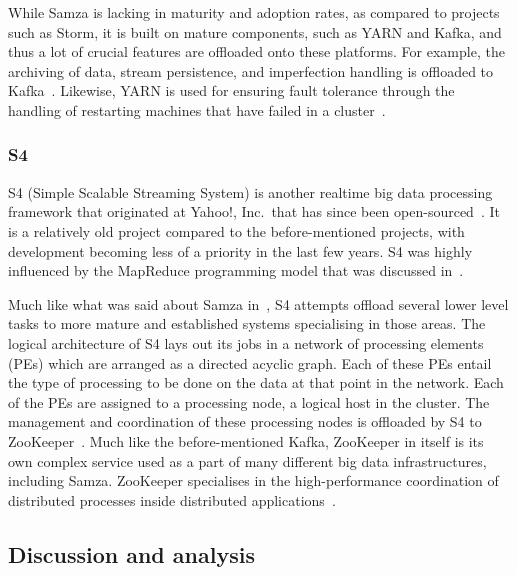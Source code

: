 While Samza is lacking in maturity and adoption rates, as compared to projects such as Storm, it is built on mature
components, such as YARN and Kafka, and thus a lot of crucial features are offloaded onto these platforms. For example,
the archiving of data, stream persistence, and imperfection handling is offloaded to Kafka~\cite{bockermann2014survey}.
Likewise, YARN is used for ensuring fault tolerance through the handling of restarting machines that have failed in a
cluster~\cite{bockermann2014survey}.


\subsubsection{S4} %
\label{ssub:s4}

S4 (Simple Scalable Streaming System) is another realtime big data processing framework that originated at Yahoo!, Inc.\
that has since been open-sourced~\cite{neumeyer2010s4}. It is a relatively old project compared to the before-mentioned projects,
with development becoming less of a priority in the last few years. S4 was highly influenced by the MapReduce programming
model that was discussed in~\sectref{ssub:mapreduce_and_gfs}.

Much like what was said about Samza in~, S4 attempts offload several lower level tasks to more
mature and established systems specialising in those areas. The logical architecture of S4 lays out its jobs in a
network of processing elements (PEs) which are arranged as a directed acyclic graph. Each of these PEs entail the type
of processing to be done on the data at that point in the network. Each of the PEs are assigned to a processing node, a
logical host in the cluster. The management and coordination of these processing nodes is offloaded by S4 to
ZooKeeper~\cite{kamburugamuve_survey_2014}. Much like the before-mentioned Kafka, ZooKeeper in itself is its own complex
service used as a part of many different big data infrastructures, including Samza. ZooKeeper specialises in the high-performance
coordination of distributed processes inside distributed applications~\cite{hunt2010zookeeper}.



\subsection{Discussion and analysis} %
\label{sub:processing_conclusion}

